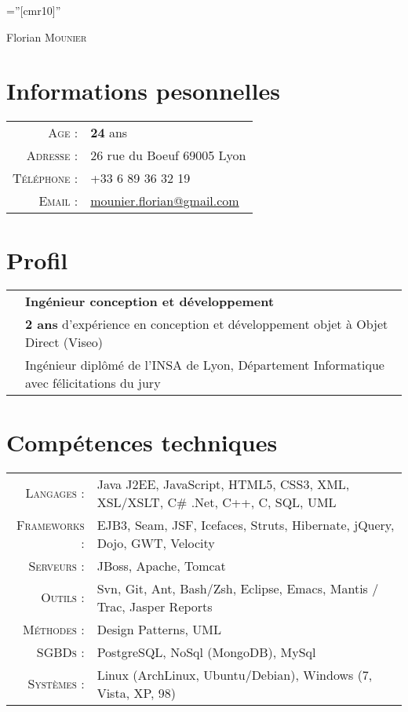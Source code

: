 \documentclass[a4paper,10pt]{article}
\begin{document}
\pagestyle{empty} %
\font\fb=''[cmr10]'' %
\par{\centering
  {\Huge Florian \textsc{Mounier}
  }\bigskip\par}

\section{Informations pesonnelles}

\begin{tabular}{rl}
  \textsc{Age :}        & \textbf{24} ans                                                    \\
  \textsc{Adresse :}    & 26 rue du Boeuf 69005 Lyon                                         \\
  \textsc{Téléphone :}  & +33 6 89 36 32 19                                                  \\
  \textsc{Email :}      & \href{mailto:mounier.florian@gmail.com}{mounier.florian@gmail.com} \\
\end{tabular}

\section{Profil}
\begin{tabular}{rl}
  & \textbf {Ingénieur conception et développement}                                          \\
  & \textbf{2 ans} d'expérience en conception et développement objet à Objet Direct (Viseo)  \\
  & Ingénieur diplômé de l'INSA de Lyon, Département Informatique avec félicitations du jury \\
\end{tabular}

\section{Compétences techniques}
\begin{tabular}{rl}
  \textsc{Langages :}        & Java J2EE, JavaScript, HTML5, CSS3, XML, XSL/XSLT, C\# .Net, C++, C, SQL, UML \\
  \textsc{Frameworks :}      & EJB3, Seam, JSF, Icefaces, Struts, Hibernate, jQuery, Dojo, GWT, Velocity     \\
  \textsc{Serveurs :}        & JBoss, Apache, Tomcat                                                         \\
  \textsc{Outils :}          & Svn, Git, Ant, Bash/Zsh, Eclipse, Emacs, Mantis / Trac, Jasper Reports        \\
  \textsc{Méthodes :}        & Design Patterns, UML                                                          \\
  \textsc{SGBDs :}           & PostgreSQL, NoSql (MongoDB), MySql                                            \\
  \textsc{Systèmes :}        & Linux (ArchLinux, Ubuntu/Debian), Windows (7, Vista, XP, 98)                  \\
\end{tabular}
\end{document}
